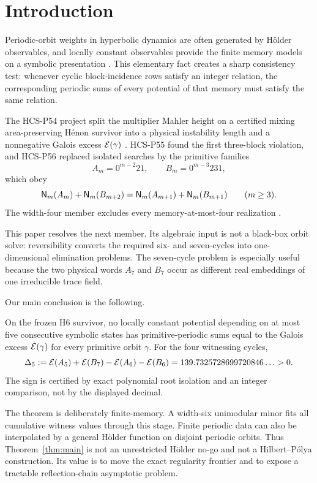 \section{Introduction}

Periodic-orbit weights in hyperbolic dynamics are often generated by
H\"older observables, and locally constant observables provide the finite
memory models on a symbolic presentation
\citep{Bowen1975,ParryPollicott1990}.  This elementary fact creates a sharp
consistency test: whenever cyclic block-incidence rows satisfy an integer
relation, the corresponding periodic sums of every potential of that memory
must satisfy the same relation.

The HCS-P54 project split the multiplier Mahler height on a certified mixing
area-preserving H\'enon survivor into a physical instability length and a
nonnegative Galois excess \(\mathcal E(\gamma)\) \citep{WangP54}.  HCS-P55 found
the first three-block violation, and HCS-P56 replaced isolated searches by
the primitive families
\begin{equation}\label{eq:families}
 A_m=0^{m-2}21,\qquad B_m=0^{m-3}231,
\end{equation}
which obey
\begin{equation}\label{eq:ladder-intro}
 \mathsf N_m(A_m)+\mathsf N_m(B_{m+2})
 =\mathsf N_m(A_{m+1})+\mathsf N_m(B_{m+1})
 \qquad(m\ge3).
\end{equation}
The width-four member excludes every memory-at-most-four realization
\citep{WangP55,WangP56}.

This paper resolves the next member.  Its algebraic input is not a black-box
orbit solve: reversibility converts the required six- and seven-cycles into
one-dimensional elimination problems.  The seven-cycle problem is
especially useful because the two physical words \(A_7\) and \(B_7\) occur
as different real embeddings of one irreducible trace field.

Our main conclusion is the following.

\begin{theorem}\label{thm:main}
On the frozen H6 survivor, no locally constant potential depending on at
most five consecutive symbolic states has primitive-periodic sums equal to
the Galois excess \(\mathcal E(\gamma)\) for every primitive orbit \(\gamma\).
For the four witnessing cycles,
\[
 \Delta_5:=\mathcal E(A_5)+\mathcal E(B_7)-\mathcal E(A_6)-\mathcal E(B_6)
 =139.7325728699720846\ldots>0.
\]
The sign is certified by exact polynomial root isolation and an integer
comparison, not by the displayed decimal.
\end{theorem}

The theorem is deliberately finite-memory.  A width-six unimodular minor
fits all cumulative witness values through this stage.  Finite periodic data
can also be interpolated by a general H\"older function on disjoint periodic
orbits.  Thus Theorem~\ref{thm:main} is not an unrestricted H\"older no-go
and not a Hilbert--P\'olya construction.  Its value is to move the exact
regularity frontier and to expose a tractable reflection-chain asymptotic
problem.
